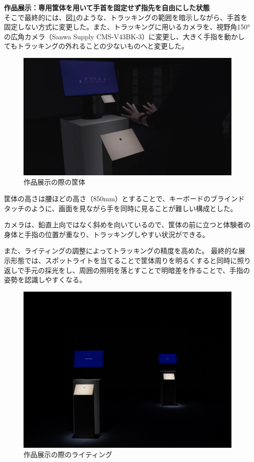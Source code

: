 \textbf{作品展示：専用筐体を用いて手首を固定せず指先を自由にした状態}\\
そこで最終的には、図\ref{fig:kyotai_ver2}のような、トラッキングの範囲を暗示しながら、手首を固定しない方式に変更した。また、トラッキングに用いるカメラを、視野角150°の広角カメラ（Sanwa Supply CMS-V43BK-3）に変更し、大きく手指を動かしてもトラッキングの外れることの少ないものへと変更した。

\begin{figure}[H]
  \centering
  \includegraphics[width=15cm]{img/kyotai_ver2.png}
  \caption{作品展示の際の筐体}
  \label{fig:kyotai_ver2}
\end{figure}

筐体の高さは腰ほどの高さ（850mm）とすることで、キーボードのブラインドタッチのように、画面を見ながら手を同時に見ることが難しい構成とした。

カメラは、鉛直上向ではなく斜めを向いているので、筐体の前に立つと体験者の身体と手指の位置が重なり、トラッキングしやすい状況ができる。

また、ライティングの調整によってトラッキングの精度を高めた。
最終的な展示形態では、スポットライトを当てることで筐体周りを明るくすると同時に照り返しで手元の採光をし、周囲の照明を落とすことで明暗差を作ることで、手指の姿勢を認識しやすくなる。

\begin{figure}[H]
  \centering
  \includegraphics[width=15cm]{img/lighting.jpg}
  \caption{作品展示の際のライティング}
  \label{fig:lighting}
\end{figure}
